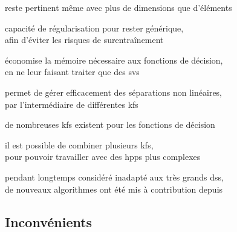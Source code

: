 \begin{itmz}
\item{reste pertinent même avec plus de dimensions que d’éléments}

\end{itmz}\begin{itmz}

\item{capacité de régularisation pour rester générique,\\
afin d’éviter les risques de surentraînement}

\end{itmz}\begin{itmz}

\item{économise la mémoire nécessaire aux fonctions de décision,\\
en ne leur faisant traiter que des \glspl{sv}}

\end{itmz}\begin{itmz}

\item{permet de gérer efficacement des séparations non linéaires,\\
par l’intermédiaire de différentes \glspl{kf}}

\end{itmz}\begin{itmz}

\item{de nombreuses \glspl{kf} existent pour les fonctions de décision}

\end{itmz}\begin{itmz}

\item{il est possible de combiner plusieurs \glspl{kf},\\
pour pouvoir travailler avec des \glspl{hpp} plus complexes}

\end{itmz}\begin{itmz}

\item{pendant longtemps considéré inadapté aux très grands \glspl{ds},\\
de nouveaux algorithmes ont été mis à contribution depuis \cite{large-scale}}

\end{itmz}


\subsection{Inconvénients}



